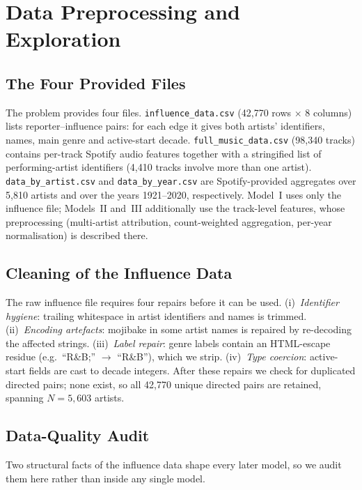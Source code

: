 \documentclass[11pt,letterpaper]{article}
\numberwithin{equation}{section}
\begin{document}
\section{Data Preprocessing and Exploration}\label{sec:data}

\subsection{The Four Provided Files}\label{subsec:data-files}

The problem provides four files.
\texttt{influence\_data.csv} (42{,}770 rows $\times$ 8 columns) lists
reporter--influence pairs: for each edge it gives both artists' identifiers,
names, main genre and active-start decade. \texttt{full\_music\_data.csv}
(98{,}340 tracks) contains per-track Spotify audio features together with a
stringified list of performing-artist identifiers (4{,}410 tracks involve
more than one artist). \texttt{data\_by\_artist.csv} and
\texttt{data\_by\_year.csv} are Spotify-provided aggregates over 5{,}810
artists and over the years 1921--2020, respectively. Model~I uses only the
influence file; Models~II and~III additionally use the track-level features,
whose preprocessing (multi-artist attribution, count-weighted aggregation,
per-year normalisation) is described there.

\subsection{Cleaning of the Influence Data}\label{subsec:data-cleaning}

The raw influence file requires four repairs before it can be used.
(i)~\emph{Identifier hygiene}: trailing whitespace in artist identifiers and
names is trimmed. (ii)~\emph{Encoding artefacts}: mojibake in some artist
names is repaired by re-decoding the affected strings. (iii)~\emph{Label
repair}: genre labels contain an HTML-escape residue (e.g.\ ``R\&B;''
$\to$ ``R\&B''), which we strip. (iv)~\emph{Type coercion}: active-start
fields are cast to decade integers. After these repairs we check for
duplicated directed pairs; none exist, so all 42{,}770 unique directed pairs
are retained, spanning \(N=5{,}603\) artists.

\subsection{Data-Quality Audit}\label{subsec:data-audit}

Two structural facts of the influence data shape every later model, so we
audit them here rather than inside any single model.
\end{document}
